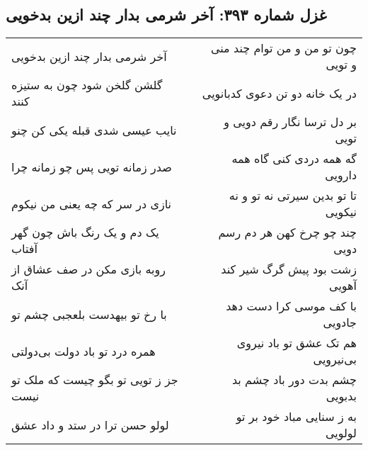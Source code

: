 \begin{center}
\section*{غزل شماره ۳۹۳: آخر شرمی بدار چند ازین بدخویی}
\label{sec:393}
\begin{longtable}{l p{0.5cm} r}
آخر شرمی بدار چند ازین بدخویی
&&
چون تو من و من توام چند منی و تویی
\\
گلشن گلخن شود چون به ستیزه کنند
&&
در یک خانه دو تن دعوی کدبانویی
\\
نایب عیسی شدی قبله یکی کن چنو
&&
بر دل ترسا نگار رقم دویی و تویی
\\
صدر زمانه تویی پس چو زمانه چرا
&&
گه همه دردی کنی گاه همه دارویی
\\
نازی در سر که چه یعنی من نیکوم
&&
تا تو بدین سیرتی نه تو و نه نیکویی
\\
یک دم و یک رنگ باش چون گهر آفتاب
&&
چند چو چرخ کهن هر دم رسم دویی
\\
روبه بازی مکن در صف عشاق از آنک
&&
زشت بود پیش گرگ شیر کند آهویی
\\
با رخ تو بیهدست بلعجبی چشم تو
&&
با کف موسی کرا دست دهد جادویی
\\
همره درد تو باد دولت بی‌دولتی
&&
هم تک عشق تو باد نیروی بی‌نیرویی
\\
جز ز تویی تو بگو چیست که ملک تو نیست
&&
چشم بدت دور باد چشم بد بدبویی
\\
لولو حسن ترا در ستد و داد عشق
&&
به ز سنایی مباد خود بر تو لولویی
\\
\end{longtable}
\end{center}
